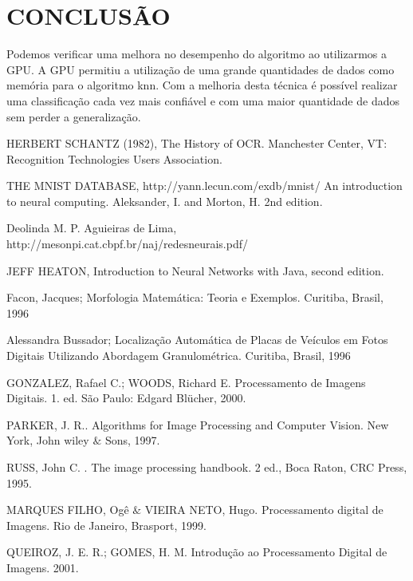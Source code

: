 \documentclass[letterpaper, 10 pt, conference]{ieeeconf}  %
\begin{document}
\section{CONCLUSÃO}
Podemos verificar uma melhora no desempenho do algoritmo ao utilizarmos a GPU. A
GPU permitiu a utilização de uma grande quantidades de dados como memória
para o algoritmo knn. Com a melhoria desta técnica é possível realizar uma
classificação cada vez mais confiável e com uma maior quantidade de dados sem
perder a generalização.


\begin{thebibliography}{1}

HERBERT SCHANTZ (1982), The History of OCR. Manchester Center, VT: Recognition Technologies Users Association.

THE MNIST DATABASE, http://yann.lecun.com/exdb/mnist/ An introduction to neural computing. Aleksander, I. and Morton, H. 2nd edition.

Deolinda M. P. Aguieiras de Lima, http://mesonpi.cat.cbpf.br/naj/redesneurais.pdf/

JEFF HEATON, Introduction to Neural Networks with Java, second edition.

Facon, Jacques; Morfologia Matemática: Teoria e Exemplos. Curitiba,
 Brasil, 1996

 Alessandra Bussador; Localização Automática de Placas de Veículos em Fotos
Digitais Utilizando Abordagem Granulométrica. Curitiba,
 Brasil, 1996

GONZALEZ, Rafael C.; WOODS, Richard E. Processamento de Imagens Digitais. 1. ed. São Paulo: Edgard Blücher, 2000.

PARKER, J. R.. Algorithms for Image Processing and Computer Vision. New York, John wiley $ \& $ Sons, 1997. 

RUSS, John C. . The image processing handbook. 2 ed., Boca Raton, CRC Press, 1995.

MARQUES FILHO, Ogê $ \& $ VIEIRA NETO, Hugo. Processamento digital de Imagens. Rio de Janeiro, Brasport, 1999.

QUEIROZ, J. E. R.; GOMES, H. M. Introdução ao Processamento Digital de Imagens. 2001. 


\end{thebibliography}
\end{document}
